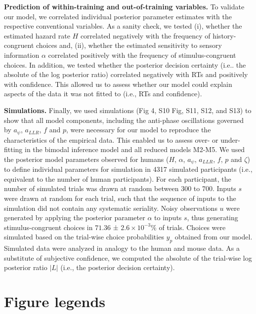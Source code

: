 \documentclass[
]{article}
\begin{document}
\textbf{Prediction of within-training and out-of-training variables.} To
validate our model, we correlated individual posterior parameter
estimates with the respective conventional variables. As a sanity check,
we tested (i), whether the estimated hazard rate \(H\) correlated
negatively with the frequency of history-congruent choices and, (ii),
whether the estimated sensitivity to sensory information \(\alpha\)
correlated positively with the frequency of stimulus-congruent choices.
In addition, we tested whether the posterior decision certainty (i.e..
the absolute of the log posterior ratio) correlated negatively with RTs
and positively with confidence. This allowed us to assess whether our
model could explain aspects of the data it was not fitted to (i.e., RTs
and confidence).

\textbf{Simulations.} Finally, we used simulations (Fig 4,
S10 Fig, S11, S12, and S13) to show that all model components,
including the anti-phase oscillations governed by \(a_{\psi}\),
\(a_{LLR}\), \(f\) and \(p\), were necessary for our model to reproduce
the characteristics of the empirical data. This enabled us to assess
over- or under-fitting in the bimodal inference model and all reduced
models M2-M5. We used the posterior model parameters observed for humans
(\(H\), \(\alpha\), \(a_{\psi}\), \(a_{LLR}\), \(f\), \(p\) and
\(\zeta\)) to define individual parameters for simulation in 4317
simulated participants (i.e., equivalent to the number of human
participants). For each participant, the number of simulated trials was
drawn at random between 300 to 700. Inputs \(s\) were drawn at random
for each trial, such that the sequence of inputs to the simulation did
not contain any systematic seriality. Noisy observations \(u\) were
generated by applying the posterior parameter \(\alpha\) to inputs
\(s\), thus generating stimulus-congruent choices in \(71.36\) ±
\(\ensuremath{2.6\times 10^{-3}}\)\% of trials. Choices were simulated
based on the trial-wise choice probabilities \(y_{p}\) obtained from our
model. Simulated data were analyzed in analogy to the human and mouse
data. As a substitute of subjective confidence, we computed the absolute
of the trial-wise log posterior ratio \(|L|\) (i.e., the posterior
decision certainty).

\newpage

\hypertarget{figures}{%
\section{Figure legends}\label{figures}}
\end{document}
